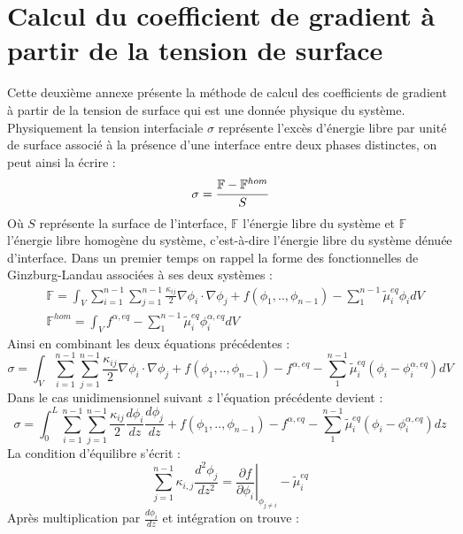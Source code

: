 
\chapter{Calcul du coefficient de gradient à partir de la tension de surface}
Cette deuxième annexe présente la méthode de calcul des coefficients de gradient à partir de la tension de surface qui est une donnée physique du système. Physiquement la tension interfaciale $\sigma$ représente l'excès d'énergie libre par unité de surface associé à la présence d'une interface entre deux phases distinctes, on peut ainsi la écrire :
\begin{equation}
\sigma = \cfrac{\mathbb{F}-\mathbb{F}^{hom}}{S}
\end{equation}
Où $S$ représente la surface de l'interface, $\mathbb{F}$ l'énergie libre du système et $\mathbb{F}$ l'énergie libre homogène du système, c'est-à-dire l'énergie libre du système dénuée d'interface. 
Dans un premier temps on rappel la forme des fonctionnelles de Ginzburg-Landau associées à ses deux systèmes :
\begin{align*}
&\mathbb{F} = \int_{V}\sum_{i=1}^{n-1}\sum_{j=1}^{n-1}\frac{\kappa_{ij}}{2}\nabla \phi_i \cdot \nabla \phi_j + f(\phi_1,..,\phi_{n-1}) - \sum_{1}^{n-1}\tilde{\mu}_i^{eq}\phi_i dV \\
&\mathbb{F}^{hom} = \int_V f^{\alpha,eq}  - \sum_{1}^{n-1}\tilde{\mu}_i^{eq}\phi_i^{\alpha,eq} dV 
\end{align*}
Ainsi en combinant les deux équations précédentes : 
\begin{equation}
\sigma = \int_{V}\sum_{i=1}^{n-1}\sum_{j=1}^{n-1}\frac{\kappa_{ij}}{2}\nabla \phi_i \cdot \nabla \phi_j + f(\phi_1,..,\phi_{n-1}) - f^{\alpha,eq} - \sum_{1}^{n-1}\tilde{\mu}_i^{eq}(\phi_i-\phi_i^{\alpha,eq}) dV
\end{equation}
Dans le cas unidimensionnel suivant $z$ l'équation précédente devient : 
\begin{equation}
\sigma = \int_{0}^L\sum_{i=1}^{n-1}\sum_{j=1}^{n-1}\frac{\kappa_{ij}}{2}\frac{ d\phi_i}{dz} \frac{ d\phi_j}{dz} + f(\phi_1,..,\phi_{n-1}) - f^{\alpha,eq} - \sum_{1}^{n-1}\tilde{\mu}_i^{eq}(\phi_i-\phi_i^{\alpha,eq}) dz
\end{equation}
La condition d'équilibre s'écrit :
\begin{equation}
\sum_{j=1}^{n-1} \kappa_{i,j} \frac{d^2\phi_j}{dz^2} = \left.\frac{\partial f}{\partial \phi_i}\right|_{\phi_{j\neq i}} - \tilde{\mu}_i^{eq}
\end{equation}
Après multiplication par $\displaystyle \frac{d\phi_i}{dz}$ et intégration on trouve :
